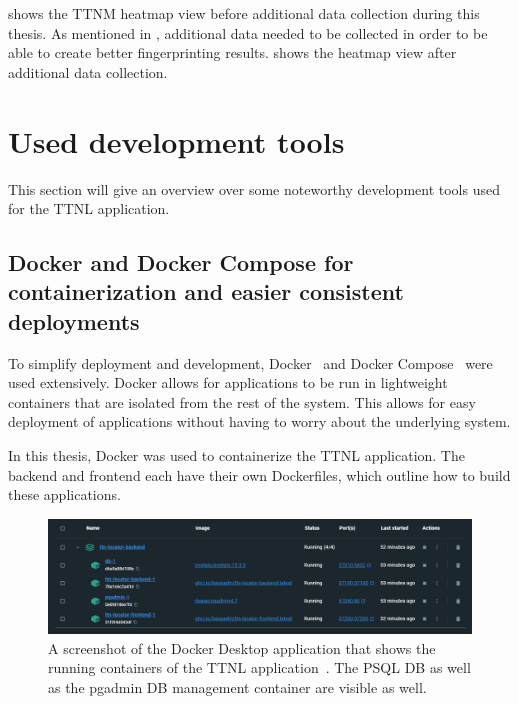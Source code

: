  shows the \ac{TTNM} heatmap view before additional data collection during this thesis.
As mentioned in , additional data needed to be collected in order to be able to create better fingerprinting results.
 shows the heatmap view after additional data collection.

\section{Used development tools}

This section will give an overview over some noteworthy development tools used for the \ac{TTNL} application.

\subsection{Docker and Docker Compose for containerization and easier consistent deployments}

To simplify deployment and development, Docker~\cite{docker_inc_docker_2022} and Docker Compose~\cite{docker_inc_docker_2023} were used extensively.
Docker allows for applications to be run in lightweight containers that are isolated from the rest of the system.
This allows for easy deployment of applications without having to worry about the underlying system.

In this thesis, Docker was used to containerize the \ac{TTNL} application.
The backend and frontend each have their own Dockerfiles, which outline how to build these applications.

\begin{figure}[htbp]
    \centering
    \includegraphics[width=1\textwidth]{pictures/ttn-locator/docker_desktop.png}
    \caption[Screenshot of the Docker Desktop application that shows the running containers of the \acl{TTNL} application]{
        A screenshot of the Docker Desktop application that shows the running containers of the \ac{TTNL} application~\cite{docker_inc_download_2021}.
        The \acl{PSQL} \ac{DB} as well as the pgadmin \ac{DB} management container are visible as well.
    }\label{pic:docker-desktop}
\end{figure}

